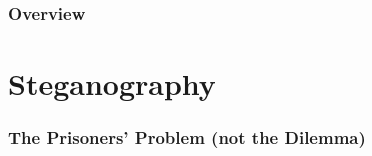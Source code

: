 \documentclass[german,table]{beamer}
\begin{document}
\begin{frame}
  \frametitle{Overview}
  \tableofcontents
  
\end{frame}

\section{Steganography}

\begin{frame}
  \frametitle{The Prisoners' Problem (not the Dilemma)}
  
  \begin{center}
\end{center}
\end{frame}
\end{document}
